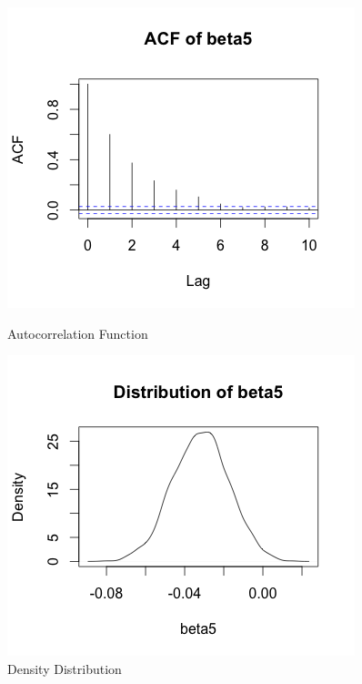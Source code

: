 \documentclass{article}
\begin{document}
\begin{figure}[!tbp]
  \centering
  \begin{minipage}[b]{0.4\textwidth}
    \includegraphics[width=\textwidth]{acfbeta5.png}
    \caption{Autocorrelation Function}
  \end{minipage}
  \hfill
  \begin{minipage}[b]{0.4\textwidth}
    \includegraphics[width=\textwidth]{distbeta5.png}
    \caption{Density Distribution}
  \end{minipage}
\end{figure}
\end{document}
